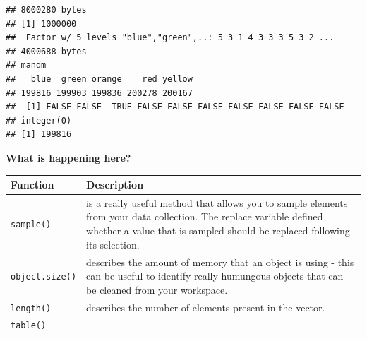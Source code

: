 \documentclass[a4paper]{book}
\begin{document}
\begin{verbatim}
## 8000280 bytes
## [1] 1000000
##  Factor w/ 5 levels "blue","green",..: 5 3 1 4 3 3 3 5 3 2 ...
## 4000688 bytes
## mandm
##   blue  green orange    red yellow 
## 199816 199903 199836 200278 200167 
##  [1] FALSE FALSE  TRUE FALSE FALSE FALSE FALSE FALSE FALSE FALSE
## integer(0)
## [1] 199816
\end{verbatim}

\textbf{What is happening here?}

\begin{longtable}[]{@{}ll@{}}
\toprule
\begin{minipage}[b]{0.21\columnwidth}\raggedright\strut
Function\strut
\end{minipage} & \begin{minipage}[b]{0.73\columnwidth}\raggedright\strut
Description\strut
\end{minipage}\tabularnewline
\midrule
\endhead
\begin{minipage}[t]{0.21\columnwidth}\raggedright\strut
\texttt{sample()}\strut
\end{minipage} & \begin{minipage}[t]{0.73\columnwidth}\raggedright\strut
is a really useful method that allows you to sample elements from your
data collection. The replace variable defined whether a value that is
sampled should be replaced following its selection.\strut
\end{minipage}\tabularnewline
\begin{minipage}[t]{0.21\columnwidth}\raggedright\strut
\texttt{object.size()}\strut
\end{minipage} & \begin{minipage}[t]{0.73\columnwidth}\raggedright\strut
describes the amount of memory that an object is using - this can be
useful to identify really humungous objects that can be cleaned from
your workspace.\strut
\end{minipage}\tabularnewline
\begin{minipage}[t]{0.21\columnwidth}\raggedright\strut
\texttt{length()}\strut
\end{minipage} & \begin{minipage}[t]{0.73\columnwidth}\raggedright\strut
describes the number of elements present in the vector.\strut
\end{minipage}\tabularnewline
\begin{minipage}[t]{0.21\columnwidth}\raggedright\strut
\texttt{table()}\strut
\end{minipage} & \begin{minipage}[t]{0.73\columnwidth}\raggedright\strut

\end{minipage}
\end{longtable}
\end{document}
